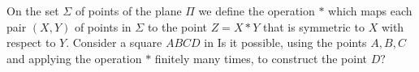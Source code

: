 On the set $\Sigma$ of points of the plane $\Pi$ we deﬁne the operation $*$ which maps each pair $(X, Y )$ of points in $\Sigma$ to the point $Z = X * Y$ that is symmetric to $X$ with respect to $Y .$ Consider a square $ABCD$ in  Is it possible, using the points $A, B, C$ and applying the operation $*$ ﬁnitely many times, to construct the point $D?$